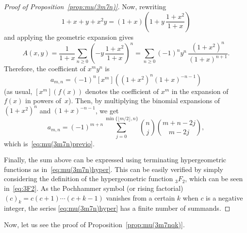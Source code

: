 \documentclass[11pt, a4paper]{article}
\theoremstyle{plain}
\theoremstyle{definition}
\begin{document}
\begin{proof}[Proof of Proposition~\ref{prop:mu(3m7n)}]
Now, rewriting
\begin{equation*}
  1+x+y+x^2y = (1+x)\left(1+y\,\frac{1+x^2}{1+x}\right)
\end{equation*}
and applying the geometric expansion gives
\begin{equation*}
  A(x,y) = \frac{1}{1+x} \sum_{n\ge0} \left(-y\,\frac{1+x^2}{1+x}\right)^n
  = \sum_{n\ge0} (-1)^n y^n\,\frac{(1+x^2)^n}{(1+x)^{n+1}}.
\end{equation*}
Therefore, the coefficient of $x^m y^n$ is
\begin{equation*}
  a_{m,n} = (-1)^n [x^m]\left((1+x^2)^n(1+x)^{-n-1}\right)
\end{equation*}
(as usual, $[x^m](f(x))$ denotes the coefficient of $x^m$ in the expansion of $f(x)$ in powers of~$x$).
Then, by multiplying the binomial expansions of $(1+x^2)^n$ and $(1+x)^{-n-1}$, we get
\begin{equation*}
  a_{m,n} = (-1)^{m+n} \sum_{j=0}^{\min\{\lfloor m/2\rfloor, n\}} \binom{n}{j} \binom{m+n-2j}{m-2j},
\end{equation*}
which is~\eqref{eq:mu(3m7n)previo}.

Finally, the sum above can be expressed using terminating hypergeometric functions as in~\eqref{eq:mu(3m7n)hyper}. This can be easily verified by simply considering the definition of the hypergeometric function ${}_3F_2$, which can be seen in~\eqref{eq:3F2}. 
As the Pochhammer symbol (or rising factorial) 
$(c)_k = c(c+1) \cdots (c+k-1)$ 
vanishes from a certain $k$ when $c$ is a negative integer, the series \eqref{eq:mu(3m7n)hyper} has a finite number of summands.
\end{proof}

Now, let us see the proof of Proposition~\ref{prop:mu(3m7nqk)}.
\end{document}
